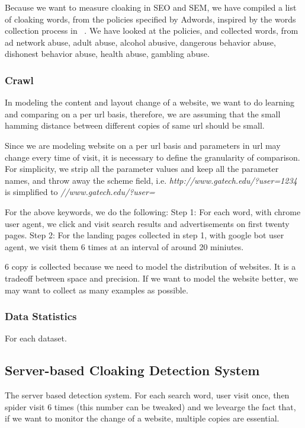 Because we want to measure cloaking in SEO and SEM, we have compiled a list of
cloaking words, from the policies specified by Adwords, inspired by the words
collection process in ~\cite{wang2011cloak}. We have looked at the policies, and
collected  words, from ad network abuse, adult abuse, alcohol abusive, dangerous behavior
abuse, dishonest behavior abuse, health abuse, gambling abuse.


\subsubsection{Crawl}

In modeling the content and layout change of a website, we want to do learning
and comparing on a per url basis, therefore, we are assuming that the small hamming
distance between different copies of same url should be small.

Since we are modeling website on a per url basis and parameters in url may
change every time of visit, it is necessary to define the granularity of
comparison. For simplicity, we strip all the parameter
values and keep all the parameter names, and throw away the scheme field, i.e.
{\it http://www.gatech.edu/?user=1234} is simplified to
{\it //www.gatech.edu/?user=}





For the above keywords, we do the following:
Step 1: For each word, with chrome user agent, we click and visit search results and advertisements on first
twenty pages.
Step 2: For the landing pages collected in step 1, with google bot user agent, we visit them 6 times at an
interval of around 20 miniutes.

6 copy is collected because we need to model the distribution of websites. It is
a tradeoff between space and precision. If we want to model the website better,
we may want to collect as many examples as possible.

\subsubsection{Data Statistics}

For each dataset.





\subsection{Server-based Cloaking Detection System}
The server based detection system.
For each search word, user visit once, then spider visit 6 times (this number
can be tweaked) and we levearge the fact that, if we want to monitor the change
of a website, multiple copies are essential.


